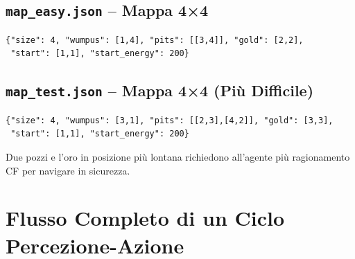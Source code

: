 \documentclass[12pt,a4paper]{article}
\begin{document}
\subsection{\texttt{map\_easy.json} -- Mappa 4×4}

\begin{lstlisting}[language=Python3, numbers=none]
{"size": 4, "wumpus": [1,4], "pits": [[3,4]], "gold": [2,2],
 "start": [1,1], "start_energy": 200}
\end{lstlisting}

\begin{center}
\end{center}

\subsection{\texttt{map\_test.json} -- Mappa 4×4 (Più Difficile)}

\begin{lstlisting}[language=Python3, numbers=none]
{"size": 4, "wumpus": [3,1], "pits": [[2,3],[4,2]], "gold": [3,3],
 "start": [1,1], "start_energy": 200}
\end{lstlisting}

Due pozzi e l'oro in posizione più lontana richiedono all'agente più
ragionamento CF per navigare in sicurezza.

\section{Flusso Completo di un Ciclo Percezione-Azione}
\end{document}
